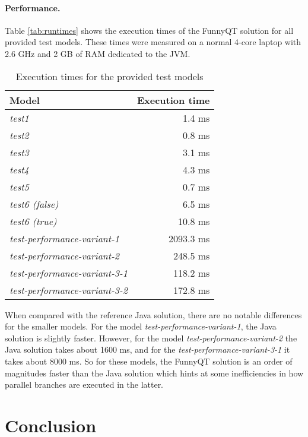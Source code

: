 \documentclass[submission]{eptcs}
\begin{document}
\paragraph{Performance.}

Table \vref{tab:runtimes} shows the execution times of the FunnyQT solution for
all provided test models.  These times were measured on a normal 4-core laptop
with 2.6 GHz and 2 GB of RAM dedicated to the JVM.

\begin{table}[h!tb]
  \centering
  \begin{tabular}{|l | r |}
    \hline
    \textbf{Model} & \textbf{Execution time}\\
    \hline
    \emph{test1} & 1.4 ms\\
    \emph{test2} & 0.8 ms\\
    \emph{test3} & 3.1 ms\\
    \emph{test4} & 4.3 ms\\
    \emph{test5} & 0.7 ms\\
    \emph{test6 (false)} & 6.5 ms\\
    \emph{test6 (true)}  & 10.8 ms\\
    \emph{test-performance-variant-1} & 2093.3 ms\\
    \emph{test-performance-variant-2} & 248.5 ms\\
    \emph{test-performance-variant-3-1} & 118.2 ms\\
    \emph{test-performance-variant-3-2} & 172.8 ms\\
    \hline
  \end{tabular}
  \caption{Execution times for the provided test models}
  \label{tab:runtimes}
\end{table}

When compared with the reference Java solution, there are no notable
differences for the smaller models.  For the model
\emph{test-performance-variant-1}, the Java solution is slightly faster.
However, for the model \emph{test-performance-variant-2} the Java solution
takes about 1600 ms, and for the \emph{test-performance-variant-3-1} it takes
about 8000 ms.  So for these models, the FunnyQT solution is an order of
magnitudes faster than the Java solution which hints at some inefficiencies in
how parallel branches are executed in the latter.


\section{Conclusion}
\label{sec:conclusion}
\end{document}
